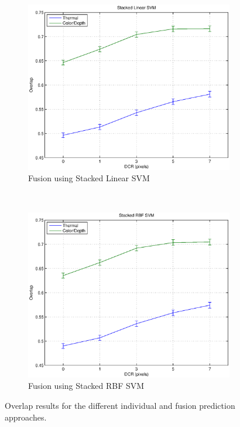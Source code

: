 \documentclass[10pt,twocolumn,letterpaper]{article}
\begin{document}
\begin{figure}[H]
	\\
	\begin{subfigure}[b]{0.47\textwidth}
 		\includegraphics[width=1\textwidth]{results/stackedlinearsvm.eps} 			
		\caption{Fusion using Stacked Linear SVM}
    		\label{fig:stackedlinearsvm}
 	\end{subfigure}
	~
	\begin{subfigure}[b]{0.47\textwidth}
 		\includegraphics[width=1\textwidth]{results/stackedrbfsvm.eps} 			
		\caption{Fusion using Stacked RBF SVM}
    		\label{fig:stackedrbfsvm}
 	\end{subfigure}
	\caption{Overlap results for the different individual and fusion prediction approaches.}
	\label{fig:overlapgraph}
\end{figure}


{\small


}
\end{document}
